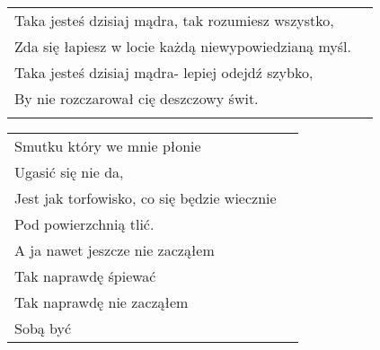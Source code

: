 \documentclass[a5paper]{article}
\begin{document}
\noindent
\begin{tabular}{@{}p{10.50cm}p{3cm}@{}}
Taka jesteś dzisiaj mądra, tak rozumiesz wszystko, \\
Zda się łapiesz w locie każdą niewypowiedzianą myśl. \\
Taka jesteś dzisiaj mądra- lepiej odejdź szybko, \\
By nie rozczarował cię deszczowy świt. \\ \\
\end{tabular}

\noindent
\begin{tabular}{@{}p{7.50cm}p{3cm}@{}}
Smutku który we mnie płonie \\
Ugasić się nie da, \\
Jest jak torfowisko, co się będzie wiecznie \\
Pod powierzchnią tlić. \\
A ja nawet jeszcze nie zacząłem \\
Tak naprawdę śpiewać \\
Tak naprawdę nie zacząłem \\
Sobą być \\
\end{tabular}
\end{document}
